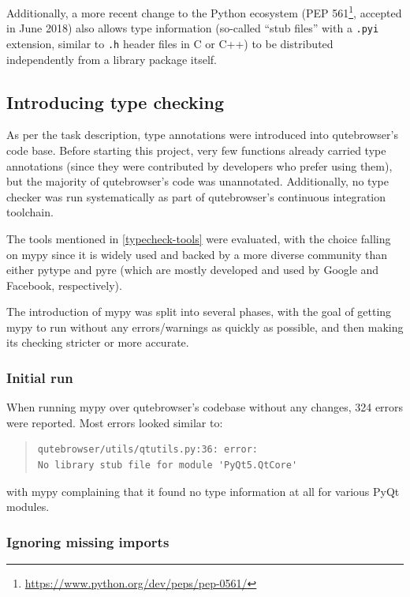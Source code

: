 \documentclass[a4paper,parskip=full]{scrreprt}
\begin{document}
\label{pep561}
Additionally, a more recent change to the Python ecosystem (PEP
561\footnote{\url{https://www.python.org/dev/peps/pep-0561/}}, accepted in June
2018) also allows type information (so-called ``stub files'' with a \verb|.pyi|
extension, similar to \verb|.h| header files in C or C++) to be distributed
independently from a library package itself.

\subsection{Introducing type checking}
As per the task description, type annotations were introduced into qutebrowser's
code base. Before starting this project, very few functions already carried type
annotations (since they were contributed by developers who prefer using them),
but the majority of qutebrowser's code was unannotated. Additionally, no type
checker was run systematically as part of qutebrowser's continuous integration
toolchain.

The tools mentioned in \ref{typecheck-tools} were evaluated, with the choice
falling on mypy since it is widely used and backed by a more diverse community
than either pytype and pyre (which are mostly developed and used by Google and
Facebook, respectively).

The introduction of mypy was split into several phases, with the goal of getting
mypy to run without any errors/warnings as quickly as possible, and then making
its checking stricter or more accurate.

\subsubsection{Initial run}
When running mypy over qutebrowser's codebase without any changes, 324 errors
were reported. Most errors looked similar to:

\begin{quote}
\begin{verbatim}
qutebrowser/utils/qtutils.py:36: error:
No library stub file for module 'PyQt5.QtCore'
\end{verbatim}
\end{quote}

with mypy complaining that it found no type information at all for various PyQt
modules.

\subsubsection{Ignoring missing imports}
\end{document}
